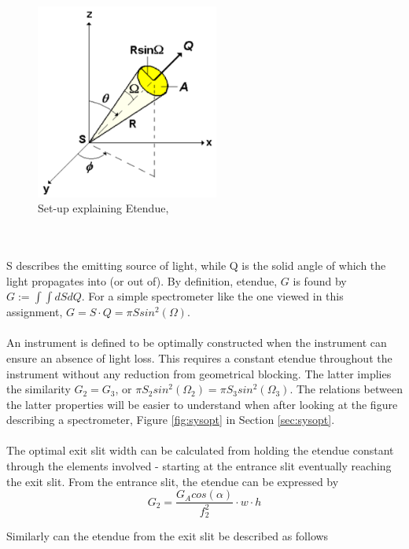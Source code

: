 \begin{figure}[H]
    \centering
    \includegraphics[width = 6cm]{Images/theory/etendue.png}
    \caption[Etendue]{Set-up explaining Etendue, \cite{sigernes2018}}
    \label{fig:etendue}
\end{figure}
\\\\
\noindent
S describes the emitting source of light, while Q is the solid angle of which the light propagates into (or out of). By definition, etendue, $G$ is found by $G := \int\int dS dQ$. For a simple spectrometer like the one viewed in this assignment, $G = S \cdot Q = \pi S sin^2(\Omega)$.
\\\\
An instrument is defined to be optimally constructed when the instrument can ensure an absence of light loss. This requires a constant etendue throughout the instrument without any reduction from geometrical blocking. The latter implies the similarity $G_2 = G_3$, or $\pi S_2 sin^2(\Omega_2) = \pi S_3 sin^2(\Omega_3)$. The relations between the latter properties will be easier to understand when after looking at the figure describing a spectrometer, Figure \ref{fig:sysopt} in Section \ref{sec:sysopt}. 
\\\\
The optimal exit slit width can be calculated from holding the etendue constant through the elements involved - starting at the entrance slit eventually reaching the exit slit. From the entrance slit, the etendue can be expressed by 
\begin{equation}
    G_2 = \frac{G_A cos(\alpha)}{f_2^2} \cdot w \cdot h
    \label{eq:etenentr}
\end{equation}

Similarly can the etendue from the exit slit be described as follows

